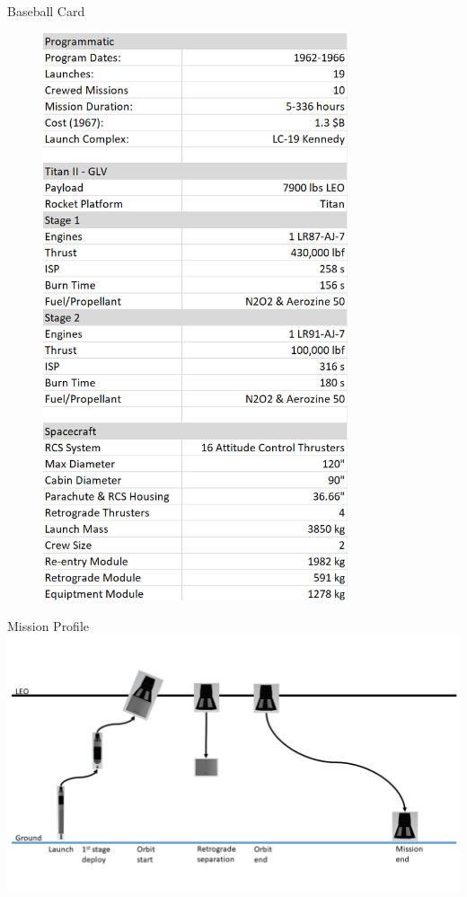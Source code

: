 \documentclass[10pt]{beamer}
\begin{document}
\begin{frame}{Baseball Card}
\begin{minipage}{0.48\textwidth}
	\end{minipage}%
\begin{minipage}{0.49\textwidth}
	\begin{figure}
		\centering
		\includegraphics[width=0.8\textwidth]{baseball.png}
	\end{figure}
	
\end{minipage}

\end{frame}

\begin{frame}{Mission Profile}
	\includegraphics[width=\textwidth]{mission_profile.png}
\end{frame}
\end{document}
